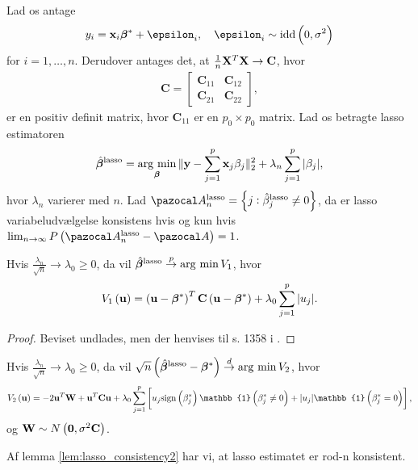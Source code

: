 Lad os antage
\begin{align*}
y_i = \x_i \tbeta^* + \epsilon_i, \quad \epsilon_i \sim \text{idd} \del{0, \sigma^2}
\end{align*}
for \(i=1, \ldots, n\).
Derudover antages det, at \(\frac{1}{n} \mathbf{X}^T \mathbf{X} \rightarrow \textbf{C}\), hvor
\begin{align*}
\textbf{C} = 
\begin{bmatrix}
\textbf{C}_{11}& \textbf{C}_{12}\\
\textbf{C}_{21}& \textbf{C}_{22}
\end{bmatrix},
\end{align*}
er en positiv definit matrix, hvor $\textbf{C}_{11}$ er en $p_0 \times p_0$ matrix. 
Lad os betragte lasso estimatoren
\begin{align*}
\hat{\boldsymbol{\beta}}^\text{lasso} = \operatorname*{\arg\,\min}_{\boldsymbol{\beta}} \Vert \mathbf{y} - \sum_{j=1}^p \mathbf{x}_j \beta_j \Vert_2^2 + \lambda_n \sum_{j=1}^p \vert \beta_j \vert,
\end{align*}
hvor \(\lambda_n\) varierer med \(n\).
Lad \(\A_n^\text{lasso} = \cbr{j : \hat{\beta}_j^\text{lasso} \neq 0}\), da er lasso variabeludvælgelse konsistens hvis og kun hvis \(\lim_{n \rightarrow \infty} P \del{\A_n^\text{lasso} - \A} = 1\).

\begin{lem}\label{lem:lasso_consistency1}
Hvis $\frac{\lambda_n}{\sqrt{n}} \rightarrow \lambda_0 \geq 0$, da vil $\hat{\boldsymbol{\beta}}^\text{lasso} \overset{p}{\rightarrow} \operatorname*{\arg\,\min} V_1$, hvor
\begin{align*}
V_1 \del{\mathbf{u}} = \del{\mathbf{u} - \tbeta^*}^T \mathbf{C} \del{\mathbf{u} - \tbeta^*} + \lambda_0 \sum_{j=1}^p \vert u_j \vert.
\end{align*}
\end{lem}
\begin{proof}
Beviset undlades, men der henvises til s. 1358 i \citep{adaptive_lasso_knight}.
\end{proof}
%
\begin{lem}\label{lem:lasso_consistency2}
Hvis $\frac{\lambda_n}{\sqrt{n}} \rightarrow \lambda_0 \geq 0$, da vil \(\sqrt{n} \del{\hat{\tbeta}^\text{lasso} - \tbeta^*} \overset{d}{\rightarrow} \argmin V_2\), hvor
\begin{align*}
V_2 \del{\mathbf{u}} = -2 \mathbf{u}^T \mathbf{W} + \mathbf{u}^T \mathbf{C} \mathbf{u} + \lambda_0 \sum_{j=1}^p \sbr{u_j \text{sign} \del{\beta^*_j} \mathbb{1} \del{\beta_j^* \neq 0} + \vert u_j \vert \mathbb{1} \del{\beta_j^* = 0}},
\end{align*}
og \(\mathbf{W} \sim N\del{\mathbf{0}, \sigma^2 \mathbf{C}}\).
\end{lem}
%
Af lemma \ref{lem:lasso_consistency2} har vi, at lasso estimatet er rod-n konsistent.


